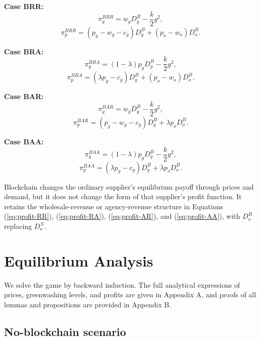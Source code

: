 \documentclass[preprint,review,12pt,authoryear,nopreprintline]{elsarticle}
\theoremstyle{definition}
\begin{document}
\noindent\textbf{Case BRR:}
\begin{equation}
\pi_g^{BRR}=w_g D_g^B-\frac{k}{2}g^2,
\end{equation}
\begin{equation}
\pi_p^{BRR}=(p_g-w_g-c_g)D_g^B+(p_o-w_o)D_o^B.
\end{equation}

\noindent\textbf{Case BRA:}
\begin{equation}
\pi_g^{BRA}=(1-\lambda)p_g D_g^B-\frac{k}{2}g^2,
\end{equation}
\begin{equation}
\pi_p^{BRA}=(\lambda p_g-c_g)D_g^B+(p_o-w_o)D_o^B.
\end{equation}

\noindent\textbf{Case BAR:}
\begin{equation}
\pi_g^{BAR}=w_gD_g^B-\frac{k}{2}g^2,
\end{equation}
\begin{equation}
\pi_p^{BAR}=(p_g-w_g-c_g)D_g^B+\lambda p_oD_o^B.
\end{equation}

\noindent\textbf{Case BAA:}
\begin{equation}
\pi_g^{BAA}=(1-\lambda)p_gD_g^B-\frac{k}{2}g^2,
\end{equation}
\begin{equation}
\pi_p^{BAA}=(\lambda p_g-c_g)D_g^B+\lambda p_oD_o^B.
\end{equation}

Blockchain changes the ordinary supplier's equilibrium payoff through prices and demand, but it does not change the form of that supplier's profit function. It retains the wholesale-revenue or agency-revenue structure in Equations (\ref{eq:profit-RR}), (\ref{eq:profit-RA}), (\ref{eq:profit-AR}), and (\ref{eq:profit-AA}), with $D_o^B$ replacing $D_o^N$.

\section{Equilibrium Analysis}\label{sec:4}

We solve the game by backward induction. The full analytical expressions of prices, greenwashing levels, and profits are given in Appendix A, and proofs of all lemmas and propositions are provided in Appendix B.

\subsection{No-blockchain scenario}
\end{document}
